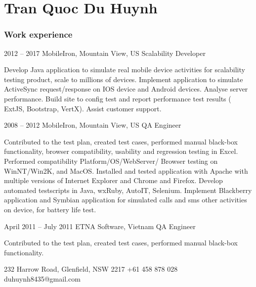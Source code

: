 \documentclass{tccv}
\begin{document}
\part{Tran Quoc Du Huynh}

\section{Work experience}

\begin{eventlist}

\item{2012 -- 2017} {MobileIron, Mountain View, US}
{Scalability Developer}

Develop Java application to simulate real mobile device
activities for scalability testing product, scale to millions
of devices.
Implement application to simulate ActiveSync request/response on IOS device and Android devices.
Analyse server performance.
\newline Build site to config test and report performance test results
 ( ExtJS, Bootstrap, VertX).
\newline Assist customer support.

\item{2008 -- 2012}
     {MobileIron, Mountain View, US}
     {QA Engineer}

Contributed to the test plan, created test cases,
  performed manual black-box functionality, browser
  compatibility, usability and regression testing in Excel.
\newline Performed compatibility Platform/OS/WebServer/
\newline Browser testing on WinNT/Win2K, and MacOS.
  Installed and tested application with Apache with
  multiple versions of Internet Explorer and Chrome and Firefox.
\newline Develop automated testscripts in Java, wxRuby, AutoIT, Selenium.
\newline Implement Blackberry application and Symbian application for simulated
calls and sms other activities on device, for battery life test.

\item{April 2011 -- July 2011}
     {ETNA Software, Vietnam}
     {QA Engineer}

Contributed to the test plan, created test cases, performed manual black-box functionality.

\end{eventlist}

\personal
    {232 Harrow Road, Glenfield, NSW 2217}
    {+61 458 878 028}
    {duhuynh8435@gmail.com}
\end{document}
